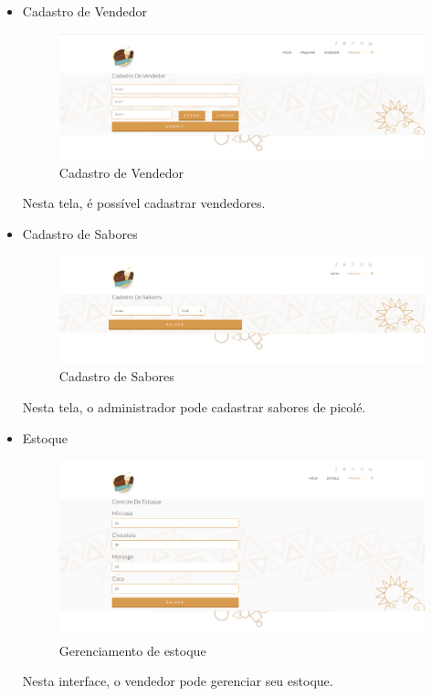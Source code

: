 \begin{itemize}
\item{Cadastro de Vendedor}

\begin{figure}[H]
	\centering
    \includegraphics[width=\textwidth]{figuras/cadastroVendedor}
    \caption{Cadastro de Vendedor}
    \label{fig:CadastroMaquinas}
\end{figure}

Nesta tela, é possível cadastrar vendedores.

\item{Cadastro de Sabores}

\begin{figure}[H]
	\centering
    \includegraphics[width=\textwidth]{figuras/cadastroSabores}
    \caption{Cadastro de Sabores}
    \label{fig:CadastroMaquinas}
\end{figure}

Nesta tela, o administrador pode cadastrar sabores de picolé.

\newpage
\item{Estoque}

\begin{figure}[H]
	\centering
    \includegraphics[width=\textwidth]{figuras/storage}
    \caption{Gerenciamento de estoque}
    \label{fig:CadastroMaquinas}
\end{figure}

Nesta interface, o vendedor pode gerenciar seu estoque.

\end{itemize}

